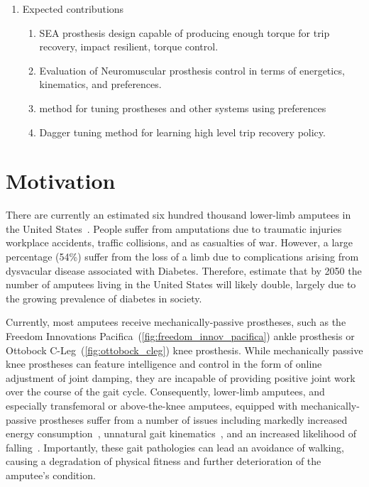 \begin{enumerate}
    \item Expected contributions
    \begin{enumerate}
        \item SEA prosthesis design capable of producing enough torque for trip
        recovery, impact resilient, torque control.
        \item Evaluation of Neuromuscular prosthesis control in terms of
        energetics, kinematics, and preferences.
        \item method for tuning prostheses and other systems using preferences
        \item Dagger tuning method for learning high level trip recovery policy.
    \end{enumerate}
\end{enumerate}

\section{Motivation}
There are currently an estimated six hundred thousand lower-limb amputees in the
United States~\citep{ziegler2008estimating}. People suffer from amputations due
to traumatic injuries workplace accidents, traffic collisions, and as casualties
of war. However, a large percentage (54\%) suffer from the loss of a limb due to
complications arising from dysvacular disease associated with Diabetes.
Therefore, \citet{ziegler2008estimating} estimate that by 2050 the number of
amputees living in the United States will likely double, largely due to the
growing prevalence of diabetes in society.


Currently,
most amputees receive mechanically-passive prostheses, such as the Freedom
Innovations Pacifica~(\cref{fig:freedom_innov_pacifica}) ankle prosthesis or 
Ottobock C-Leg~(\cref{fig:ottobock_cleg}) knee prosthesis. While mechanically
passive knee prostheses can feature intelligence and control in the form of
online adjustment of joint damping, they are incapable of providing positive
joint work over the course of the gait cycle. Consequently, lower-limb amputees,
and especially transfemoral or above-the-knee amputees, equipped with
mechanically-passive prostheses suffer from a number of issues including
markedly increased energy consumption~\citep{}, unnatural gait
kinematics~\citep{}, and an increased likelihood of falling~\citep{}.
Importantly, these gait pathologies can lead an avoidance of walking, causing
a degradation of physical fitness and further deterioration of the amputee's
condition.

